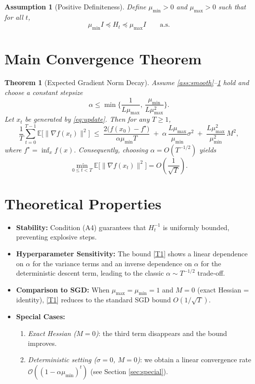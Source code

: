 \documentclass{article}
\newtheorem{assumption}{Assumption}
\newtheorem{theorem}{Theorem}
\newcommand{\E}{\mathbb{E}}
\begin{document}
\begin{assumption}[Positive Definiteness]\label{ass:posdef}
Define $\mu_{\min}>0$ and $\mu_{\max}>0$ such that for all $t$,
\[
\mu_{\min} I\preceq H_t\preceq \mu_{\max} I\qquad\text{a.s.}
\tag{A4}
\]
\end{assumption}

\section*{Main Convergence Theorem}
\begin{theorem}[Expected Gradient Norm Decay]\label{thm:main}
Assume \ref{ass:smooth}–\ref{ass:posdef} hold and choose a constant stepsize
\[
\alpha\le \min\Big\{\frac{1}{L\mu_{\max}},\,\frac{\mu_{\min}}{L\mu_{\max}^{2}}\Big\}.
\]
Let $x_t$ be generated by \eqref{eq:update}. Then for any $T\ge 1$,
\[
\frac{1}{T}\sum_{t=0}^{T-1}\E\big[\|\nabla f(x_t)\|^{2}\big]\;
\le\;
\frac{2\big(f(x_0)-f^{\star}\big)}{\alpha\mu_{\min}T}
\;+\;
\alpha\,\frac{L\mu_{\max}}{\mu_{\min}}\sigma^{2}
\;+\;
\frac{L\mu_{\max}^{2}}{\mu_{\min}^{2}}\,M^{2},
\tag{T1}
\]
where $f^{\star}=\inf_{x}f(x)$. Consequently, choosing $\alpha=O(T^{-1/2})$ yields
\[
\min_{0\le t<T}\E\big[\|\nabla f(x_t)\|^{2}\big]=O\!\left(\frac{1}{\sqrt{T}}\right).
\]
\end{theorem}

\section*{Theoretical Properties}
\begin{itemize}[nosep]
  \item \textbf{Stability:} Condition (A4) guarantees that $H_t^{-1}$ is uniformly bounded, preventing explosive steps.
  \item \textbf{Hyperparameter Sensitivity:} The bound \eqref{T1} shows a linear dependence on $\alpha$ for the variance terms and an inverse dependence on $\alpha$ for the deterministic descent term, leading to the classic $\alpha\sim T^{-1/2}$ trade‑off.
  \item \textbf{Comparison to SGD:} When $\mu_{\max}=\mu_{\min}=1$ and $M=0$ (exact Hessian = identity), \eqref{T1} reduces to the standard SGD bound $O(1/\sqrt{T})$.
  \item \textbf{Special Cases:}
    \begin{enumerate}
      \item \emph{Exact Hessian ($M=0$)}: the third term disappears and the bound improves.
      \item \emph{Deterministic setting ($\sigma=0$, $M=0$)}: we obtain a linear convergence rate $\mathcal{O}((1-\alpha\mu_{\min})^{t})$ (see Section \ref{sec:special}).
    \end{enumerate}
\end{itemize}
\end{document}
